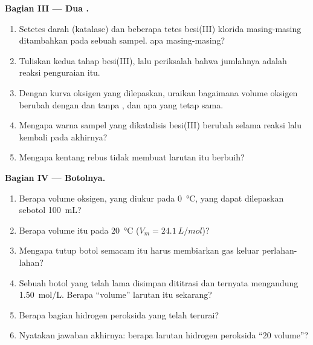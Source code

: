 \begin{problem}
\medskip
\noindent\textbf{Bagian III --- Dua .}
\begin{enumerate}[resume]
  \item Setetes darah (katalase) dan beberapa tetes besi(III) klorida
        masing-masing ditambahkan pada sebuah sampel.  apa
        masing-masing?
  \item Tuliskan kedua tahap  besi(III), lalu periksalah bahwa
        jumlahnya adalah reaksi penguraian itu.
  \item Dengan kurva oksigen yang dilepaskan, uraikan bagaimana volume
        oksigen berubah dengan dan tanpa , dan apa yang tetap
        sama.
  \item Mengapa warna sampel yang dikatalisis besi(III) berubah selama
        reaksi lalu kembali pada akhirnya?
  \item Mengapa kentang rebus tidak membuat larutan itu berbuih?
\end{enumerate}

\medskip
\noindent\textbf{Bagian IV --- Botolnya.}
\begin{enumerate}[resume]
  \item Berapa volume oksigen, yang diukur pada \qty{0}{\celsius}, yang
        dapat dilepaskan sebotol \qty{100}{mL}?
  \item Berapa volume itu pada \qty{20}{\celsius} ($V_m =
        \qty{24.1}{L/mol}$)?
  \item Mengapa tutup botol semacam itu harus membiarkan gas keluar
        perlahan-lahan?
  \item Sebuah botol yang telah lama disimpan dititrasi dan ternyata
        mengandung \qty{1.50}{mol/L}. Berapa ``volume'' larutan itu
        sekarang?
  \item Berapa bagian hidrogen peroksida yang telah terurai?
  \item Nyatakan jawaban akhirnya: berapa  larutan
        hidrogen peroksida ``20 volume''?
\end{enumerate}
\end{problem}
